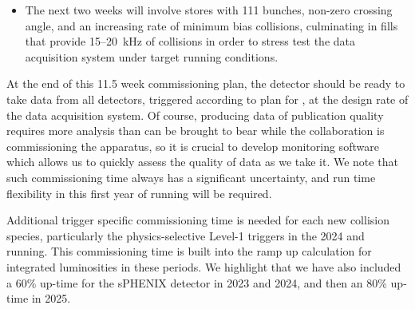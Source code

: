 \begin{itemize}
\item The next two weeks will involve stores with 111 bunches,
  non-zero crossing angle, and an increasing rate of minimum bias
  collisions, culminating in fills that provide 15--20~kHz of
  collisions in order to stress test the data acquisition system under
  target running conditions.

\end{itemize}

At the end of this 11.5 week commissioning plan, the detector should be
ready to take data from all detectors, triggered according to plan for
\auau, at the design rate of the data acquisition system.  Of course,
producing data of publication quality requires more analysis than can
be brought to bear while the collaboration is commissioning the
apparatus, so it is crucial to develop monitoring software which
allows us to quickly assess the quality of data as we take it.  We
note that such commissioning time always has a significant uncertainty,
and run time flexibility in this first year of running will be
required.

Additional trigger specific commissioning time is needed for each new
collision species, particularly the physics-selective Level-1 triggers
in the 2024 \pp and \pau running.  This commissioning time is built
into the ramp up calculation for integrated luminosities in these
periods.  We highlight that we have also included a 60\% up-time for
the sPHENIX detector in 2023 and 2024, and then an 80\% up-time in
2025.
